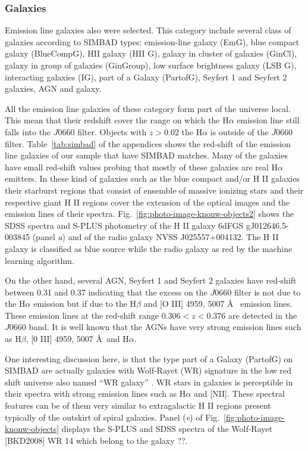 \documentclass[fleqn,usenatbib]{mnras}
\begin{document}
\subsubsection{Galaxies}
Emission line galaxies also were selected. This category include
several class of galaxies according to SIMBAD types: emission-line galaxy (EmG),
blue compact galaxy (BlueCompG), HII galaxy (HII G), galaxy in cluster of galaxies
(GinCl), galaxy in group of galaxies (GinGroup), low surface brightness galaxy
(LSB G), interacting galaxies (IG), part of a Galaxy (PartofG), Seyfert 1 and
Seyfert 2 galaxies, AGN and galaxy.

All the emission line galaxies of these category form part of the universe local.
This mean that their redshift cover the range on which the H{$\alpha$} emission line still
falls into the $J0660$ filter. Objects with $ z >  0.02$ the  H{$\alpha$} is outside 
of the $J0660$ filter. Table~\ref{tab:simbad} of the appendices shows the red-shift of the
emission line galaxies of our sample that have SIMBAD matches. Many of the galaxies have 
small red-shift values probing that mostly of these galaxies are real H{$\alpha$} emitters. 
In these kind of galaxies such as the blue 
compact and/or H II galaxies their starburst regions that consist of ensemble of massive 
ionizing stars and their respective giant H II regions cover the extension of the optical 
images and the emission lines of their spectra. Fig.~\ref{fig:photo-image-knonw-objects2}
shows the SDSS spectra and S-PLUS photometry of the H II galaxy 6dFGS gJ012646.5-003845 
(panel \textit{a}) and of the radio galaxy NVSS J025557+004132. The H II galaxy is classified 
as blue source while the radio galaxy as red by the machine learning algorithm. 

On the other hand, several AGN, Seyfert 1 and Seyfert 2 galaxies have red-shift 
between 0.31 and 0.37 indicating that the excess on the $J0660$ filter
is not due to the H{$\alpha$} emission but if due to the H{$\beta$} and [O III] 4959, 5007 \AA~ 
emission lines. These emission lines at the red-shift range $0.306 < z < 0.376$ are detected in the $J0660$ band. It is well known that the AGNs have very strong emission 
lines such as H{$\beta$}, [0 III] 4959, 5007 \AA~and H{$\alpha$}.

One interesting discussion here, is that the type part of a Galaxy (PartofG)
on SIMBAD are actually galaxies with Wolf-Rayet (WR) signature in the low red shift
universe also named ``WR galaxy'' \citep{Osterbrock:1982}. WR stars in galaxies
is perceptible in their spectra with strong emission lines such as H{$\alpha$}
and [NII]. These spectral features can be of them very similar to extragalactic
H II regions present typically of the outskirt of spiral galaxies. Panel (\textit{e}) 
of Fig.~\ref{fig:photo-image-knonw-objects} displays the S-PLUS and SDSS spectra 
of the  Wolf-Rayet [BKD2008] WR 14 which belong to the galaxy ??.
\end{document}
